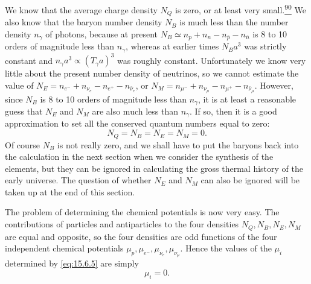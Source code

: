 We know that the average charge density \(N_Q\) is zero, or at least very
small.\hyperref[ch15-ref-90]{\textsuperscript{90}} We also know that the baryon
number density \(N_B\) is much less than the number density \(n_\gamma\) of
photons, because at present
\(N_B\simeq n_p+n_n-n_{\bar p}-n_{\bar n}\) is 8 to 10 orders of magnitude
less than \(n_\gamma\), whereas at earlier times \(N_Ba^3\) was strictly
constant and \(n_\gamma a^3\propto(T_\gamma a)^3\) was roughly constant.
Unfortunately we know very little about the present number density of
neutrinos, so we cannot estimate the value of
\(N_E=n_{e^-}+n_{\nu_e}-n_{e^+}-n_{\bar\nu_e}\), or
\(N_M=n_{\mu^-}+n_{\nu_\mu}-n_{\mu^+}-n_{\bar\nu_\mu}\). However, since
\(N_B\) is 8 to 10 orders of magnitude less than \(n_\gamma\), it is at least
a reasonable guess that \(N_E\) and \(N_M\) are also much less than
\(n_\gamma\). If so, then it is a good approximation to set all the conserved
quantum numbers equal to zero:
\begin{equation}
  N_Q=N_B=N_E=N_M=0.
  \tag{15.6.5}\label{eq:15.6.5}
\end{equation}
Of course \(N_B\) is not really zero, and we shall have to put the baryons back
into the calculation in the next section when we consider the synthesis of the
elements, but they can be ignored in calculating the gross thermal history of
the early universe. The question of whether \(N_E\) and \(N_M\) can also be
ignored will be taken up at the end of this section.

The problem of determining the chemical potentials is now very easy. The
contributions of particles and antiparticles to the four densities
\(N_Q,N_B,N_E,N_M\) are equal and opposite, so the four densities are odd
functions of the four independent chemical potentials
\(\mu_p,\mu_{e^-},\mu_{\nu_e},\mu_{\nu_\mu}\). Hence the values of the
\(\mu_i\) determined by \eqref{eq:15.6.5} are simply
\begin{equation}
  \mu_i=0.
  \tag{15.6.6}\label{eq:15.6.6}
\end{equation}

